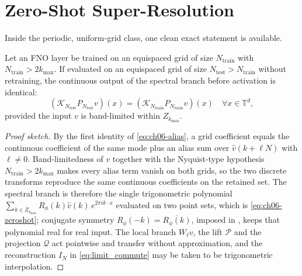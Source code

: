 \section{Zero-Shot Super-Resolution}
\label{sec:ch06-zeroshot}

Inside the periodic, uniform-grid class, one clean exact statement is available.

\begin{proposition}
\label{prop:ch06-zeroshot}
Let an FNO layer be trained on an equispaced grid of size $N_{\text{train}}$
with $N_{\text{train}} > 2 k_{\max}$. If evaluated on an equispaced grid of size
$N_{\text{test}} > N_{\text{train}}$ without retraining, the continuous output
of the spectral branch before activation is identical:
\begin{equation}
  \label{eq:ch06-zeroshot}
  (\mathcal{K}_{N_{\text{test}}} P_{N_{\text{test}}} v)(x) = (\mathcal{K}_{N_{\text{train}}} P_{N_{\text{train}}} v)(x) \quad \forall x \in \mathbb{T}^d,
\end{equation}
provided the input $v$ is band-limited within $Z_{k_{\max}}$.
\end{proposition}

\begin{proof}[Proof sketch]
By the first identity of \eqref{eq:ch06-alias}, a grid coefficient equals the
continuous coefficient of the same mode plus an alias sum over
$\hat v(k+\ell N)$ with $\ell\neq0$. Band-limitedness of $v$ together with the
Nyquist-type hypothesis $N_{\text{train}} > 2k_{\max}$ makes every alias term
vanish on both grids, so the two discrete transforms reproduce the same
continuous coefficients on the retained set. The spectral branch is therefore
the single trigonometric polynomial
$\sum_{k\in Z_{k_{\max}}} R_\phi(k)\hat v(k)\,e^{2\pi i k\cdot x}$
evaluated on two point sets, which is \eqref{eq:ch06-zeroshot}; conjugate
symmetry $R_\phi(-k)=\overline{R_\phi(k)}$, imposed in
, keeps that
polynomial real for real input. The local branch $W_\ell v$, the lift
$\mathcal{P}$ and the projection $\mathcal{Q}$ act pointwise and transfer
without approximation, and the reconstruction $I_N$ in
\eqref{eq:limit_commute} may be taken to be trigonometric
interpolation.
\end{proof}

